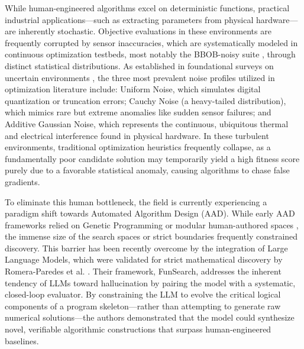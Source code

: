 While human-engineered algorithms excel on deterministic functions, practical industrial applications---such as extracting parameters from physical hardware---are inherently stochastic. Objective evaluations in these environments are frequently corrupted by sensor inaccuracies, which are systematically modeled in continuous optimization testbeds, most notably the BBOB-noisy suite \cite{Hansen2009Noisy}, through distinct statistical distributions. As established in foundational surveys on uncertain environments \cite{Jin2005}, the three most prevalent noise profiles utilized in optimization literature include: Uniform Noise, which simulates digital quantization or truncation errors; Cauchy Noise (a heavy-tailed distribution), which mimics rare but extreme anomalies like sudden sensor failures; and Additive Gaussian Noise, which represents the continuous, ubiquitous thermal and electrical interference found in physical hardware. In these turbulent environments, traditional optimization heuristics frequently collapse, as a fundamentally poor candidate solution may temporarily yield a high fitness score purely due to a favorable statistical anomaly, causing algorithms to chase false gradients.


To eliminate this human bottleneck, the field is currently experiencing a paradigm shift towards Automated Algorithm Design (AAD). While early AAD frameworks relied on Genetic Programming \cite{Burke2013} or modular human-authored spaces \cite{vanRijn2016}, the immense size of the search spaces or strict boundaries frequently constrained discovery. This barrier has been recently overcome by the integration of Large Language Models, which were validated for strict mathematical discovery by Romera-Paredes et al. \cite{Romera2023}. Their framework, FunSearch, addresses the inherent tendency of LLMs toward hallucination by pairing the model with a systematic, closed-loop evaluator. By constraining the LLM to evolve the critical logical components of a program skeleton---rather than attempting to generate raw numerical solutions---the authors demonstrated that the model could synthesize novel, verifiable algorithmic constructions that surpass human-engineered baselines. 


